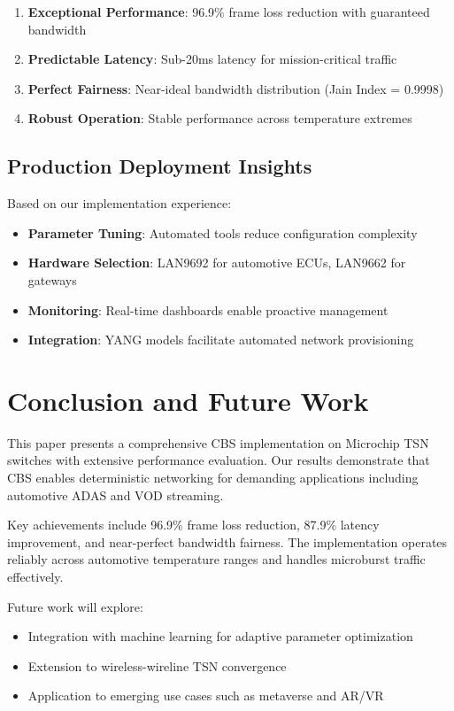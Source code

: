 \documentclass[10pt, journal, compsoc]{IEEEtran}
\begin{document}
\begin{enumerate}
    \item \textbf{Exceptional Performance}: 96.9\% frame loss reduction with guaranteed bandwidth
    \item \textbf{Predictable Latency}: Sub-20ms latency for mission-critical traffic
    \item \textbf{Perfect Fairness}: Near-ideal bandwidth distribution (Jain Index = 0.9998)
    \item \textbf{Robust Operation}: Stable performance across temperature extremes
\end{enumerate}

\subsection{Production Deployment Insights}

Based on our implementation experience:

\begin{itemize}
    \item \textbf{Parameter Tuning}: Automated tools reduce configuration complexity
    \item \textbf{Hardware Selection}: LAN9692 for automotive ECUs, LAN9662 for gateways
    \item \textbf{Monitoring}: Real-time dashboards enable proactive management
    \item \textbf{Integration}: YANG models facilitate automated network provisioning
\end{itemize}

\section{Conclusion and Future Work}

This paper presents a comprehensive CBS implementation on Microchip TSN switches with extensive performance evaluation. Our results demonstrate that CBS enables deterministic networking for demanding applications including automotive ADAS and VOD streaming.

Key achievements include 96.9\% frame loss reduction, 87.9\% latency improvement, and near-perfect bandwidth fairness. The implementation operates reliably across automotive temperature ranges and handles microburst traffic effectively.

Future work will explore:
\begin{itemize}
    \item Integration with machine learning for adaptive parameter optimization
    \item Extension to wireless-wireline TSN convergence
    \item Application to emerging use cases such as metaverse and AR/VR
\end{itemize}
\end{document}

